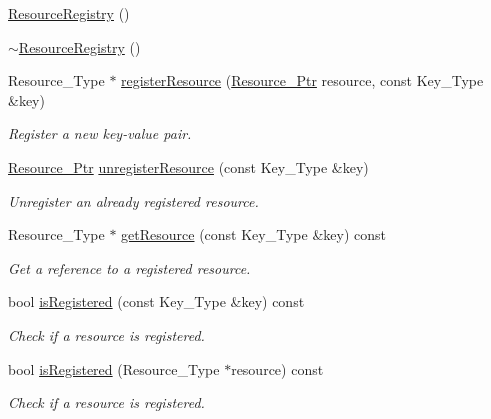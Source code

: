 \begin{DoxyCompactItemize}
\item 
\mbox{\hyperlink{classec_1_1_resource_registry_a8ab460d164b940e5b08dfbe0b9e27263}{Resource\+Registry}} ()
\item 
\mbox{\hyperlink{classec_1_1_resource_registry_a3b2ee8793e4fa32075be7ce3a59fe472}{$\sim$\+Resource\+Registry}} ()
\item 
Resource\+\_\+\+Type $\ast$ \mbox{\hyperlink{classec_1_1_resource_registry_a64545efa3e392204f02ebe388b2a54a6}{register\+Resource}} (\mbox{\hyperlink{classec_1_1_resource_registry_aa3069d67662599730165c5d0df3043c9}{Resource\+\_\+\+Ptr}} resource, const Key\+\_\+\+Type \&key)
\begin{DoxyCompactList}\small\item\em Register a new key-\/value pair. \end{DoxyCompactList}\item 
\mbox{\hyperlink{classec_1_1_resource_registry_aa3069d67662599730165c5d0df3043c9}{Resource\+\_\+\+Ptr}} \mbox{\hyperlink{classec_1_1_resource_registry_a637ecd8b81f8efe21b7c5153213b8213}{unregister\+Resource}} (const Key\+\_\+\+Type \&key)
\begin{DoxyCompactList}\small\item\em Unregister an already registered resource. \end{DoxyCompactList}\item 
Resource\+\_\+\+Type $\ast$ \mbox{\hyperlink{classec_1_1_resource_registry_a8ec3d2c20682a59f944fcf145e23103e}{get\+Resource}} (const Key\+\_\+\+Type \&key) const
\begin{DoxyCompactList}\small\item\em Get a reference to a registered resource. \end{DoxyCompactList}\item 
bool \mbox{\hyperlink{classec_1_1_resource_registry_afe08f6227ad0e2263b65a807cef44cf4}{is\+Registered}} (const Key\+\_\+\+Type \&key) const
\begin{DoxyCompactList}\small\item\em Check if a resource is registered. \end{DoxyCompactList}\item 
bool \mbox{\hyperlink{classec_1_1_resource_registry_a390baad918714b91edc22670d1f72fd9}{is\+Registered}} (Resource\+\_\+\+Type $\ast$resource) const
\begin{DoxyCompactList}\small\item\em Check if a resource is registered. \end{DoxyCompactList}\end{DoxyCompactItemize}


